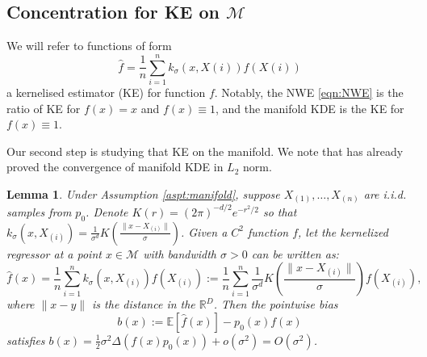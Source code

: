 \documentclass{article}
\newtheorem{lemma}[theorem]{Lemma}
\def\calM{\mathcal{M}}
\begin{document}
\subsection{Concentration for KE on $\calM$}
\label{sub:KDEproof}
We will refer to functions of form 
\[
\widehat{f}=\frac{1}{n}\sum_{i=1}^n k_{\sigma}(x,X(i)) f(X(i)) 
\]
a kernelised estimator (KE) for function $f$. Notably, the NWE \eqref{eqn:NWE} is the ratio of KE for $f(x)=x$ and $f(x)\equiv 1$, and the manifold KDE is the KE for $f(x)\equiv 1$. 

Our second step is studying  that KE on the manifold.  We note that \cite{ozakin2009submanifold} has already proved the convergence of manifold KDE in $L_2$ norm. 
\begin{lemma}
 \label{lem: pointwise_bias} 
  Under Assumption \ref{aspt:manifold}, suppose $X_{(1)},\ldots, X_{(n)}$ are i.i.d. samples from $p_0$. Denote \( K(r) = (2\pi)^{-d/2} e^{-r^2/2} \) so that \(k_\sigma(x, X_{(i)}) = \frac{1}{\sigma^d} K\left( \frac{\|x-X_{(i)}\|}{\sigma} \right)\). 
  Given a $C^2$ function $f$,
  let the kernelized regressor at a point \( x \in \mathcal{M} \) with bandwidth \( \sigma > 0 \) can be written as:
\[
\widehat{f}(x) = \frac{1}{n} \sum\limits_{i=1}^n k_\sigma(x, X_{(i)}) f(X_{(i)}):= \frac{1}{n} \sum_{i=1}^n \frac{1}{\sigma^d} K\left( \frac{\|x - X_{(i)}\|}{\sigma} \right)f(X_{(i)}),
\]
where \( \|x-y\| \) is the distance in the \(\mathbb{R}^D\).
Then the pointwise bias
\[
b(x) := \mathbb{E}[\hat{f}(x)] - p_0(x)f(x)
\]
satisfies $b(x)=\frac{1}{2} \sigma^2 \Delta (f(x)p_0(x))+o(\sigma^2)=O(\sigma^2)$. 
\end{lemma}
\end{document}

